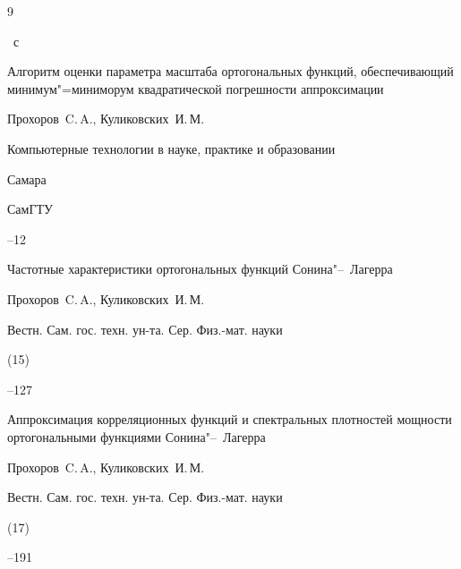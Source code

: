 \begin{thebibliography}{9}

~с




\paper Алгоритм оценки параметра масштаба ортогональных функций, обеспечивающий минимум"=миниморум квадратической погрешности аппроксимации

\by Прохоров~C.\,A., Куликовских~И.\,М.

\inbook Компьютерные технологии в науке, практике и образовании

\publaddr Самара

\publ СамГТУ


--12




\paper Частотные характеристики ортогональных функций Сонина"--~Лагерра

\by Прохоров~C.\,A., Куликовских~И.\,М.

\jour Вестн. Сам. гос. техн. ун-та. Сер. Физ.-мат. науки


(15)

--127




\paper Аппроксимация корреляционных функций и спектральных плотностей мощности ортогональными функциями Сонина"--~Лагерра

\by Прохоров~C.\,A., Куликовских~И.\,М.

\jour Вестн. Сам. гос. техн. ун-та. Сер. Физ.-мат. науки


(17)

--191

\end{thebibliography}






\makeengtitle










% 

